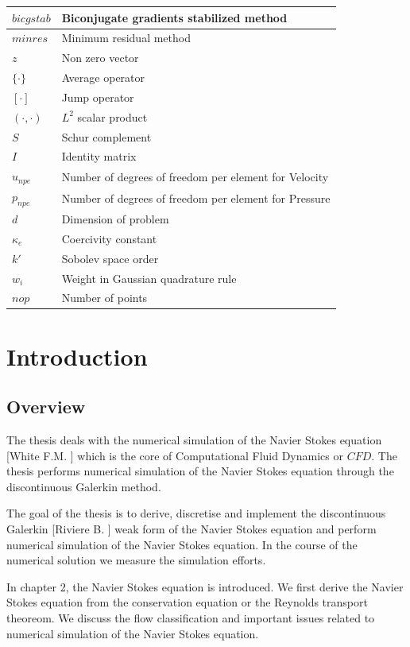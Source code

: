 \documentclass[a4paper]{book}
\begin{document}
\begin{longtable}{| p{} | p{} |}
\hline
$bicgstab$ & Biconjugate gradients stabilized method\\
\hline
$minres$ & Minimum residual method\\
\hline
$z$ & Non zero vector\\
\hline
$\lbrace \cdot \rbrace$ & Average operator\\
\hline
$[\cdot]$ & Jump operator\\
\hline
$(\cdot,\cdot)$ & $L^2$ scalar product\\
\hline
$S$ & Schur complement\\
\hline
$I$ & Identity matrix\\
\hline
$u_{npe}$ & Number of degrees of freedom per element for Velocity\\
\hline
$p_{npe}$ & Number of degrees of freedom per element for Pressure\\
\hline
$d$ & Dimension of problem\\
\hline
$\kappa_e$ & Coercivity constant\\
\hline
$k'$ & Sobolev space order\\
\hline
$w_i$ & Weight in Gaussian quadrature rule\\
\hline
$nop$ & Number of points\\
\hline
\end{longtable}
\listoffigures
\listoftables

\tableofcontents

\chapter{Introduction}

\section{Overview}

The thesis deals with the numerical simulation of the Navier Stokes equation [White F.M. \cite{white}] which is the core of Computational Fluid Dynamics or $CFD$. The thesis performs numerical simulation of the Navier Stokes equation through the discontinuous Galerkin method.

The goal of the thesis is to derive, discretise and implement the discontinuous Galerkin [Riviere B. \cite{riviere}] weak form of the Navier Stokes equation and perform numerical simulation of the Navier Stokes equation. In the course of the numerical solution we measure the simulation efforts. 

In chapter 2, the Navier Stokes equation is introduced. We first derive the Navier Stokes equation from the conservation equation or the Reynolds transport theoreom. We discuss the flow classification and important issues related to numerical simulation of the Navier Stokes equation. 
\end{document}
